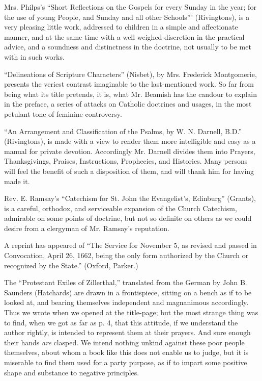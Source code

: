 Mrs. Philps's ``Short Reflections on the Gospels for
every Sunday in the year; for the use of young People, and Sunday and
all other Schools''' (Rivingtons), is a very pleasing little work,
addressed to children in a simple and affectionate manner, and at the
same time with a well-weighed discretion in the practical advice, and a
soundness and distinctness in the doctrine, not usually to be met with
in such works.

``Delineations of Scripture Characters'' (Nisbet), by
Mrs. Frederick Montgomerie, presents the veriest contrast imaginable to
the last-mentioned work. So far from being what its title pretends, it
is, what Mr. Beamish has the candour to explain in the preface, a series
of attacks on Catholic doctrines and usages, in the most petulant tone
of feminine controversy.

``An Arrangement and Classification of the Psalms,
by W. N. Darnell, B.D.'' (Rivingtons), is made with a view to render them
more intelligible and easy as a manual for private devotion. Accordingly
Mr. Darnell divides them into Prayers, Thanksgivings, Praises,
Instructions, Prophecies, and Histories. Many persons will feel the
benefit of such a disposition of them, and will thank him for having
made it.

Rev. E. Ramsay's ``Catechism for St. John the
Evangelist's, Edinburg'' (Grants), is a careful, orthodox, and
serviceable expansion of the Church Catechism, admirable on some points
of doctrine, but not so definite on others as we could desire from a
clergyman of Mr. Ramsay's reputation.

A reprint has appeared of ``The Service for November
5, as revised and passed in Convocation, April 26, 1662, being the only
form authorized by the Church or recognized by the State.'' (Oxford,
Parker.)

The ``Protestant Exiles of Zillerthal,'' translated
from the German by John B. Saunders (Hatchards) are drawn in a
frontispiece, sitting on a bench as if to be looked at, and bearing
themselves independent and magnanimous accordingly. Thus we wrote when
we opened at the title-page; but the most strange thing was to find,
when we got as far as p. 4, that this attitude, if we understand the
author rightly, is intended to represent them at their prayers. And sure
enough their hands \emph{are} clasped. We intend nothing unkind against
these poor people themselves, about whom a book like this does not
enable us to judge, but it is miserable to find them used for a party
purpose, as if to impart some positive shape and substance to negative
principles.

